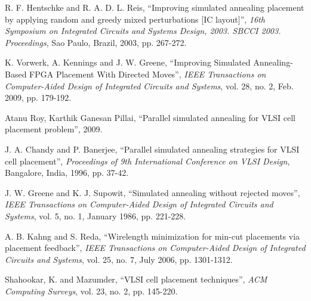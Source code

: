 \documentclass[conference]{IEEEtran}
\begin{document}
\begin{thebibliography}{00}
 R. F. Hentschke and R. A. D. L. Reis, ``Improving simulated annealing placement by applying random and greedy mixed perturbations [IC layout]'', \textit{16th Symposium on Integrated Circuits and Systems Design, 2003. SBCCI 2003. Proceedings}, Sao Paulo, Brazil, 2003, pp. 267-272.

 K. Vorwerk, A. Kennings and J. W. Greene, ``Improving Simulated Annealing-Based FPGA Placement With Directed Moves'', \textit{IEEE Transactions on Computer-Aided Design of Integrated Circuits and Systems}, vol. 28, no. 2, Feb. 2009, pp. 179-192.

 Atanu Roy, Karthik Ganesan Pillai, ``Parallel simulated annealing for VLSI
cell placement problem'', 2009.

 J. A. Chandy and P. Banerjee, ``Parallel simulated annealing strategies for VLSI cell placement'', \textit{Proceedings of 9th International Conference on VLSI Design}, Bangalore, India, 1996, pp. 37-42.

 J. W. Greene and K. J. Supowit, ``Simulated annealing without rejected moves'', \textit{IEEE Transactions on Computer-Aided Design of Integrated Circuits and Systems}, vol. 5, no. 1, January 1986, pp. 221-228.

 A. B. Kahng and S. Reda, ``Wirelength minimization for min-cut placements via placement feedback'', \textit{IEEE Transactions on Computer-Aided Design of Integrated Circuits and Systems}, vol. 25, no. 7, July 2006, pp. 1301-1312.

 Shahookar, K. and Mazumder, ``VLSI cell placement techniques'', \textit{ACM Computing Surveys}, vol. 23, no. 2, pp. 145-220.

\end{thebibliography}
\end{document}
